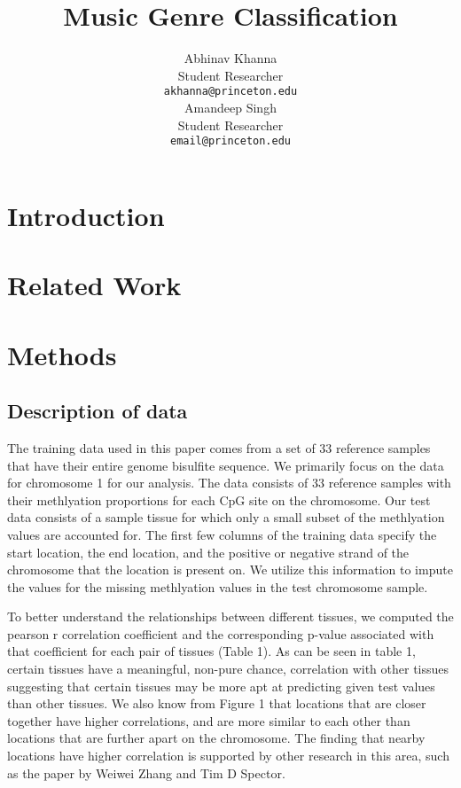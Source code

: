 \documentclass{article} %
\title{Music Genre Classification}
\author{
Abhinav Khanna\\
Student Researcher\\
\texttt{akhanna@princeton.edu} \\
\And
Amandeep Singh \\
Student Researcher \\
\texttt{email@princeton.edu} \\
}
\begin{document}
\maketitle

\begin{abstract}
\end{abstract}

\section{Introduction}


\section{Related Work}


\section{Methods}
\subsection{Description of data}
The training data used in this paper comes from a set of 33 reference samples that have their entire genome bisulfite sequence. We primarily focus on the data for chromosome 1 for our analysis. The data consists of 33 reference samples with their methlyation proportions for each CpG site on the chromosome. Our test data consists of a sample tissue for which only a small subset of the methlyation values are accounted for. The first few columns of the training data specify the start location, the end location, and the positive or negative strand of the chromosome that the location is present on. We utilize this information to impute the values for the missing methlyation values in the test chromosome sample.

To better understand the relationships between different tissues, we computed the pearson r correlation coefficient and the corresponding p-value associated with that coefficient for each pair of tissues (Table 1). As can be seen in table 1, certain tissues have a meaningful, non-pure chance, correlation with other tissues suggesting that certain tissues may be more apt at predicting given test values than other tissues. We also know from Figure 1 that locations that are closer together have higher correlations, and are more similar to each other than locations that are further apart on the chromosome. The finding that nearby locations have higher correlation is supported by other research in this area, such as the paper by Weiwei Zhang and Tim D Spector. 
\end{document}

